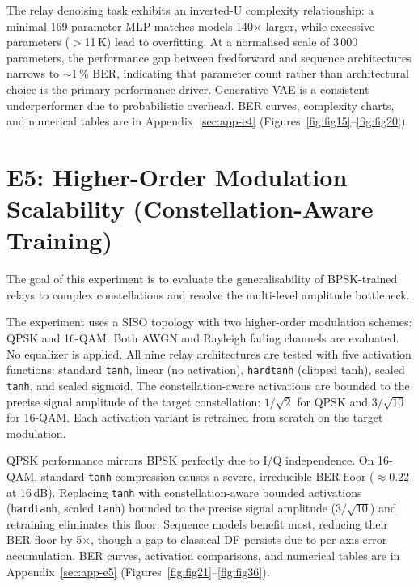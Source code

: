 The relay denoising task exhibits an inverted-U complexity relationship: a minimal
169-parameter MLP matches models 140$\times$ larger, while excessive parameters
($>$11\,K) lead to overfitting. At a normalised scale of 3\,000 parameters, the
performance gap between feedforward and sequence architectures narrows to $\sim$1\,\%
BER, indicating that parameter count rather than architectural choice is the primary
performance driver. Generative VAE is a consistent underperformer due to probabilistic
overhead.
BER curves, complexity charts, and numerical tables are in Appendix~\ref{sec:app-e4}
(Figures~\ref{fig:fig15}--\ref{fig:fig20}).

\section{E5: Higher-Order Modulation Scalability (Constellation-Aware Training)}\label{sec:higher-order-modulation-scalability-constellation-aware-training}

The goal of this experiment is to evaluate the generalisability of BPSK-trained relays
to complex constellations and resolve the multi-level amplitude bottleneck.

The experiment uses a SISO topology with two higher-order modulation schemes: QPSK and
16-QAM. Both AWGN and Rayleigh fading channels are evaluated. No equalizer is applied.
All nine relay architectures are tested with five activation functions: standard
\texttt{tanh}, linear (no activation), \texttt{hardtanh} (clipped tanh), scaled
\texttt{tanh}, and scaled sigmoid. The constellation-aware activations are bounded to
the precise signal amplitude of the target constellation: $1/\sqrt{2}$ for QPSK and
$3/\sqrt{10}$ for 16-QAM. Each activation variant is retrained from scratch on the
target modulation.

QPSK performance mirrors BPSK perfectly due to I/Q independence. On 16-QAM, standard
\texttt{tanh} compression causes a severe, irreducible BER floor ($\approx$0.22 at
16\,dB). Replacing \texttt{tanh} with constellation-aware bounded activations
(\texttt{hardtanh}, scaled \texttt{tanh}) bounded to the precise signal amplitude
($3/\sqrt{10}$) and retraining eliminates this floor. Sequence models benefit most,
reducing their BER floor by 5$\times$, though a gap to classical DF persists due to
per-axis error accumulation.
BER curves, activation comparisons, and numerical tables are in
Appendix~\ref{sec:app-e5}
(Figures~\ref{fig:fig21}--\ref{fig:fig36}).

